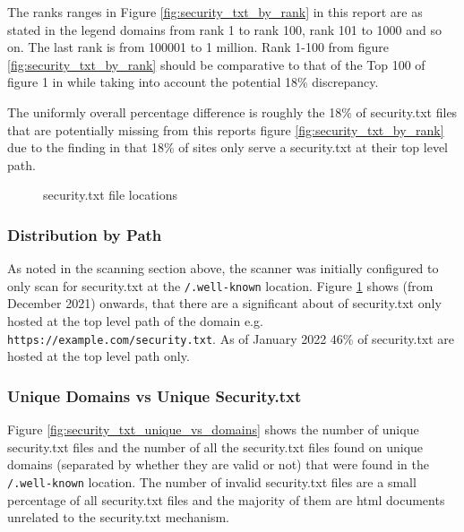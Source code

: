\documentclass{mscreport}
\begin{document}
\vspace{0.3cm} \noindent
The ranks ranges in Figure \ref{fig:security_txt_by_rank} in this report are as stated in the legend domains from rank 1 to rank 100, rank 101 to 1000 and so on. The last rank is from 100001 to 1 million. Rank 1-100 from figure \ref{fig:security_txt_by_rank} should be comparative to that of the Top 100 of figure 1 in \cite{Poteat2021-zr} while taking into account the potential 18\% discrepancy.

\vspace{0.3cm} \noindent
The uniformly overall percentage difference is roughly the 18\% of security.txt files that are potentially missing from this reports figure \ref{fig:security_txt_by_rank} due to the finding in \cite{Poteat2021-zr} that 18\% of sites only serve a security.txt at their top level path.

\newpage

\begin{figure}[t]
	\begin{center}
		\caption{security.txt file locations}
		\label{fig:security_txt_by_root_vs_non_root}
	\end{center}
\end{figure}

\subsubsection{Distribution by Path}

\noindent
As noted in the scanning section above, the scanner was initially configured to only scan for security.txt at the \texttt{/.well-known} location. Figure \ref{fig:security_txt_by_root_vs_non_root} shows (from December 2021) onwards, that there are a significant about of security.txt only hosted at the top level path of the domain e.g. \newline \texttt{https://example.com/security.txt}. As of January 2022 46\% of security.txt are hosted at the top level path only.

\subsubsection{Unique Domains vs Unique Security.txt}

\noindent
Figure \ref{fig:security_txt_unique_vs_domains} shows the number of unique security.txt files and the number of all the security.txt files found on unique domains (separated by whether they are valid or not) that were found in the \texttt{/.well-known} location. The number of invalid security.txt files are a small percentage of all security.txt files and the majority of them are html documents unrelated to the security.txt mechanism.
\end{document}
